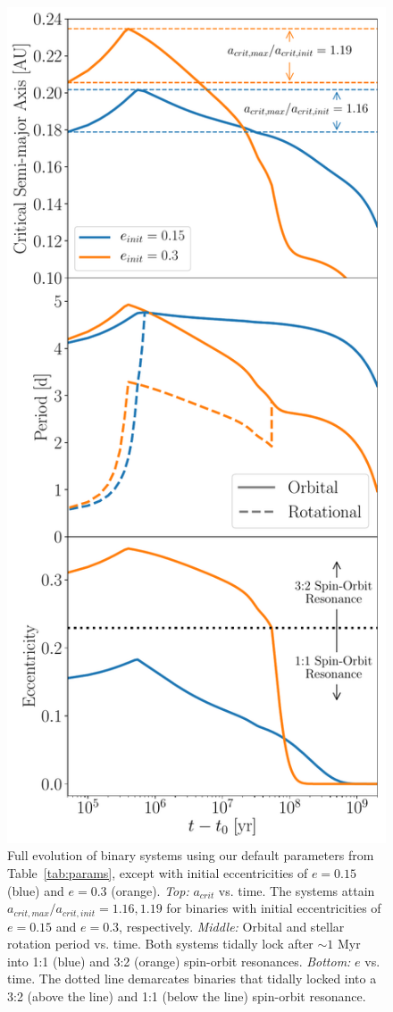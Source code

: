 \begin{figure}[h]
	\includegraphics[scale=0.5]{ecc_comp.pdf}
   \caption{Full evolution of binary systems using our default parameters from Table~\ref{tab:params}, except with initial eccentricities of $e = 0.15$ (blue) and $e = 0.3$ (orange).  {\it Top:} $a_{crit}$ vs. time.  The systems attain $a_{crit,max}/a_{crit,init} = 1.16, 1.19$ for binaries with initial eccentricities of $e = 0.15$ and $e = 0.3$, respectively. {\it Middle:} Orbital and stellar rotation period vs. time.  Both systems tidally lock after ${\sim}1$ Myr into 1:1 (blue) and 3:2 (orange) spin-orbit resonances.  {\it Bottom:} $e$ vs. time.  The dotted line demarcates binaries that tidally locked into a 3:2 (above the line) and 1:1 (below the line) spin-orbit resonance.}
    \label{fig:ecc_comp}
\end{figure}

